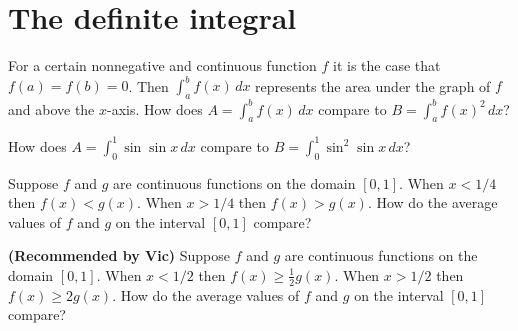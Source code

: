 \documentclass{ximera}
\newcommand{\recommendation}[1]{\textbf{(Recommended by #1)}}
\begin{document}
\section{The definite integral}

\begin{problem}
  For a certain nonnegative and continuous function $f$ it is the case
  that $f(a) = f(b) = 0$.  Then $\int_a^b f(x) \, dx$ represents the
  area under the graph of $f$ and above the $x$-axis.  How does $A = \int_a^b f(x) \, dx$ compare to $B = \int_a^b f(x)^2 \, dx$?
  \begin{multipleChoice}
  \end{multipleChoice}
\end{problem}

\begin{problem}
  How does $A = \int_0^1 \sin \sin x \, dx$ compare to $B = \int_0^1 \sin^2 \sin x \, dx$?
  \begin{multipleChoice}
  \end{multipleChoice}
\end{problem}

\begin{problem}
  Suppose $f$ and $g$ are continuous functions on the domain $[0,1]$.  When $x < 1/4$ then $f(x) < g(x)$.  When $x > 1/4$ then $f(x) > g(x)$.  How do the average values of $f$ and $g$ on the interval $[0,1]$ compare?
  \begin{multipleChoice}
  \end{multipleChoice}
\end{problem}

\begin{problem}
\recommendation{Vic}
  Suppose $f$ and $g$ are continuous functions on the domain $[0,1]$.  When $x < 1/2$ then $f(x) \geq \frac{1}{2} g(x)$.  When $x > 1/2$ then $f(x) \geq 2 g(x)$.  How do the average values of $f$ and $g$ on the interval $[0,1]$ compare?
  \begin{multipleChoice}
  \end{multipleChoice}
\end{problem}
\end{document}
